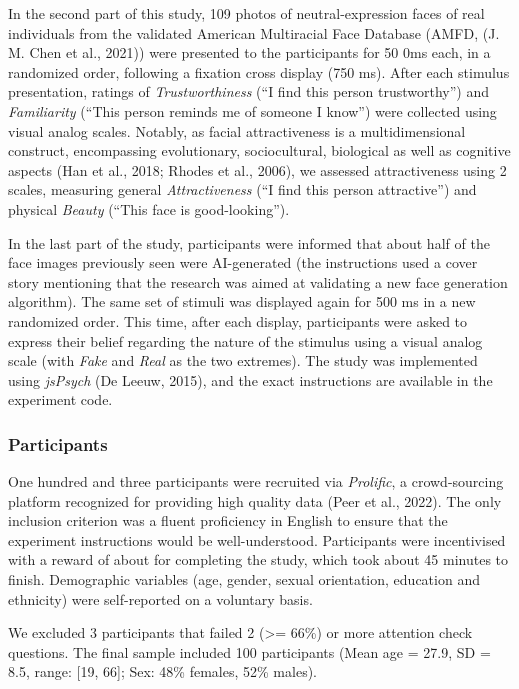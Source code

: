 \documentclass[
  man,floatsintext]{apa6}
\begin{document}
In the second part of this study, 109 photos of neutral-expression faces of real individuals from the validated American Multiracial Face Database (AMFD, (J. M. Chen et al., 2021)) were presented to the participants for 50 0ms each, in a randomized order, following a fixation cross display (750 ms). After each stimulus presentation, ratings of \emph{Trustworthiness} (``I find this person trustworthy'') and \emph{Familiarity} (``This person reminds me of someone I know'') were collected using visual analog scales. Notably, as facial attractiveness is a multidimensional construct, encompassing evolutionary, sociocultural, biological as well as cognitive aspects (Han et al., 2018; Rhodes et al., 2006), we assessed attractiveness using 2 scales, measuring general \emph{Attractiveness} (``I find this person attractive'') and physical \emph{Beauty} (``This face is good-looking'').

In the last part of the study, participants were informed that about half of the face images previously seen were AI-generated (the instructions used a cover story mentioning that the research was aimed at validating a new face generation algorithm). The same set of stimuli was displayed again for 500 ms in a new randomized order. This time, after each display, participants were asked to express their belief regarding the nature of the stimulus using a visual analog scale (with \emph{Fake} and \emph{Real} as the two extremes). The study was implemented using \emph{jsPsych} (De Leeuw, 2015), and the exact instructions are available in the experiment code.

\hypertarget{participants}{%
\subsubsection{Participants}\label{participants}}

One hundred and three participants were recruited via \emph{Prolific}, a crowd-sourcing platform recognized for providing high quality data (Peer et al., 2022). The only inclusion criterion was a fluent proficiency in English to ensure that the experiment instructions would be well-understood. Participants were incentivised with a reward of about  for completing the study, which took about 45 minutes to finish. Demographic variables (age, gender, sexual orientation, education and ethnicity) were self-reported on a voluntary basis.

We excluded 3 participants that failed 2 (\textgreater= 66\%) or more attention check questions. The final sample included 100 participants (Mean age = 27.9, SD = 8.5, range: {[}19, 66{]}; Sex: 48\% females, 52\% males).
\end{document}
